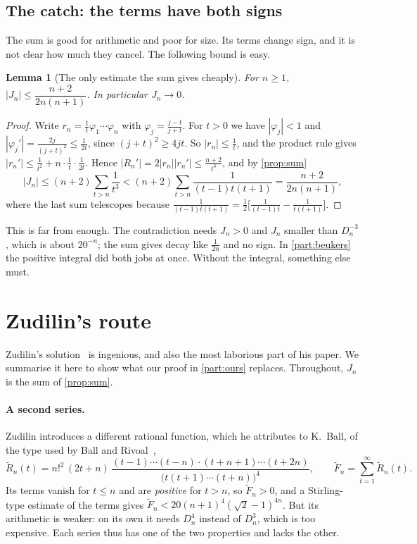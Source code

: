 \documentclass[11pt]{article}
\newcommand{\Dn}{D_n}
\theoremstyle{plain}
\newtheorem{lemma}[theorem]{Lemma}
\theoremstyle{definition}
\theoremstyle{remark}
\begin{document}
\subsection{The catch: the terms have both signs}

The sum is good for arithmetic and poor for size. Its terms change sign, and it is not
clear how much they cancel. The following bound is easy.

\begin{lemma}[The only estimate the sum gives cheaply]\label{lem:crude}
For $n\ge1$, \ $|J_n|\le\dfrac{n+2}{2n(n+1)}$. In particular $J_n\to0$.
\end{lemma}

\begin{proof}
Write $r_n=\frac1t\varphi_1\cdots\varphi_n$ with $\varphi_j=\frac{j-t}{j+t}$. For $t>0$ we have
$|\varphi_j|<1$ and $|\varphi_j'|=\frac{2j}{(j+t)^2}\le\frac1{2t}$, since $(j+t)^2\ge4jt$. So
$|r_n|\le\frac1t$, and the product rule gives $|r_n'|\le\frac1{t^2}+n\cdot\frac1t\cdot\frac1{2t}$.
Hence $|R_n'|=2|r_n||r_n'|\le\frac{n+2}{t^3}$, and by \cref{prop:sum}
\[
  |J_n|\le(n+2)\sum_{t>n}\frac1{t^3}<(n+2)\sum_{t>n}\frac1{(t-1)t(t+1)}=\frac{n+2}{2n(n+1)},
\]
where the last sum telescopes because $\frac1{(t-1)t(t+1)}=\frac12\bigl[\frac1{(t-1)t}-\frac1{t(t+1)}\bigr]$.
\end{proof}

This is far from enough. The contradiction needs $J_n>0$ and $J_n$ smaller than $\Dn^{-3}$,
which is about $20^{-n}$; the sum gives decay like $\frac1{2n}$ and no sign. In \cref{part:beukers}
the positive integral did both jobs at once. Without the integral, something else must.

\section{Zudilin's route}\label{sec:zudilin-route}

Zudilin's solution~\cite{zudilin} is ingenious, and also the most laborious part of his paper. We
summarise it here to show what our proof in \cref{part:ours} replaces. Throughout, $J_n$ is the sum of \cref{prop:sum}.

\paragraph{A second series.} Zudilin introduces a different rational function, which he attributes to K.~Ball,
of the type used by Ball and Rivoal~\cite{ballrivoal,rivoal},
\[
  \widetilde R_n(t)=n!^2\,(2t+n)\,\frac{(t-1)\cdots(t-n)\cdot(t+n+1)\cdots(t+2n)}{\bigl(t(t+1)\cdots(t+n)\bigr)^4},
  \qquad \widetilde F_n=\sum_{t=1}^\infty\widetilde R_n(t).
\]
Its terms vanish for $t\le n$ and are \emph{positive} for $t>n$, so $\widetilde F_n>0$, and a
Stirling-type estimate of the terms gives $\widetilde F_n<20(n+1)^4(\sqrt2-1)^{4n}$. But its
arithmetic is weaker: on its own it needs $\Dn^4$ instead of $\Dn^3$, which is too expensive.
Each series thus has one of the two properties and lacks the other.
\end{document}
